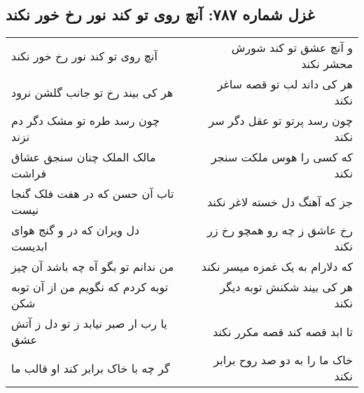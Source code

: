\begin{center}
\section*{غزل شماره ۷۸۷: آنچ روی تو کند نور رخ خور نکند}
\label{sec:0787}
\begin{longtable}{l p{0.5cm} r}
آنچ روی تو کند نور رخ خور نکند
&&
و آنچ عشق تو کند شورش محشر نکند
\\
هر کی بیند رخ تو جانب گلشن نرود
&&
هر کی داند لب تو قصه ساغر نکند
\\
چون رسد طره تو مشک دگر دم نزند
&&
چون رسد پرتو تو عقل دگر سر نکند
\\
مالک الملک چنان سنجق عشاق فراشت
&&
که کسی را هوس ملکت سنجر نکند
\\
تاب آن حسن که در هفت فلک گنجا نیست
&&
جز که آهنگ دل خسته لاغر نکند
\\
دل ویران که در و گنج هوای ابدیست
&&
رخ عاشق ز چه رو همچو رخ زر نکند
\\
من ندانم تو بگو آه چه باشد آن چیز
&&
که دلارام به یک غمزه میسر نکند
\\
توبه کردم که نگویم من از آن توبه شکن
&&
هر کی بیند شکنش توبه دیگر نکند
\\
یا رب ار صبر نیابد ز تو دل ز آتش عشق
&&
تا ابد قصه کند قصه مکرر نکند
\\
گر چه با خاک برابر کند او قالب ما
&&
خاک ما را به دو صد روح برابر نکند
\\
\end{longtable}
\end{center}
